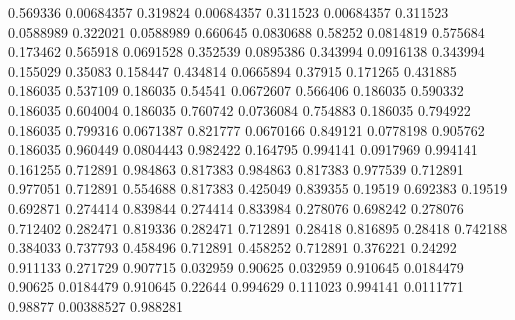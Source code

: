 0.569336 0.00684357
0.319824 0.00684357
0.311523 0.00684357
0.311523 0.0588989
0.322021 0.0588989
0.660645 0.0830688
0.58252 0.0814819
0.575684 0.173462
0.565918 0.0691528
0.352539 0.0895386
0.343994 0.0916138
0.343994 0.155029
0.35083 0.158447
0.434814 0.0665894
0.37915 0.171265
0.431885 0.186035
0.537109 0.186035
0.54541 0.0672607
0.566406 0.186035
0.590332 0.186035
0.604004 0.186035
0.760742 0.0736084
0.754883 0.186035
0.794922 0.186035
0.799316 0.0671387
0.821777 0.0670166
0.849121 0.0778198
0.905762 0.186035
0.960449 0.0804443
0.982422 0.164795
0.994141 0.0917969
0.994141 0.161255
0.712891 0.984863
0.817383 0.984863
0.817383 0.977539
0.712891 0.977051
0.712891 0.554688
0.817383 0.425049
0.839355 0.19519
0.692383 0.19519
0.692871 0.274414
0.839844 0.274414
0.833984 0.278076
0.698242 0.278076
0.712402 0.282471
0.819336 0.282471
0.712891 0.28418
0.816895 0.28418
0.742188 0.384033
0.737793 0.458496
0.712891 0.458252
0.712891 0.376221
0.24292 0.911133
0.271729 0.907715
0.032959 0.90625
0.032959 0.910645
0.0184479 0.90625
0.0184479 0.910645
0.22644 0.994629
0.111023 0.994141
0.0111771 0.98877
0.00388527 0.988281

